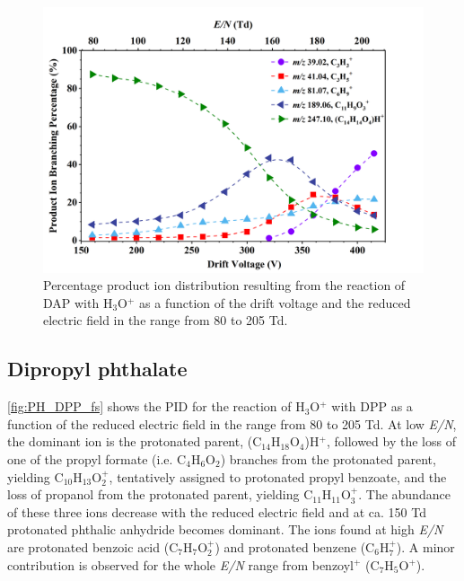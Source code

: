 \begin{figure}[htb]%
\centering
\includegraphics[height=0.35\textheight]{pics/DAP-BR.png}
\caption{Percentage product ion distribution resulting from the reaction of DAP with H$_3$O$^+$ as a function of the drift voltage and the reduced electric field in the range from 80 to 205 Td.}
\label{fig:PH_DAP_fs}
\end{figure}
%





\subsection{Dipropyl phthalate}


\autoref{fig:PH_DPP_fs} shows the PID for the reaction of H$_3$O$^+$ with DPP as a function of the reduced electric field in the range from 80 to 205 Td.
%
At low \textit{E/N}, the dominant ion is the protonated parent, (C$_{14}$H$_{18}$O$_4$)H$^+$, followed by the  loss of one of the propyl formate (i.e. C$_4$H$_6$O$_2$) branches from the protonated parent, yielding C$_{10}$H$_{13}$O$_2^+$, tentatively assigned to protonated propyl benzoate, and the loss of propanol from the protonated parent, yielding C$_{11}$H$_{11}$O$_3^+$. 
%
The abundance of these three ions decrease with the reduced electric field and at ca. 150 Td protonated phthalic anhydride becomes dominant.
%
The ions found at high \textit{E/N} are protonated benzoic acid (C$_{7}$H$_{7}$O$_2^+$) and  protonated benzene (C$_6$H$_{7}^+$).
A minor contribution is observed for the whole \textit{E/N} range from benzoyl$^+$ (C$_7$H$_{5}$O$^+$).

